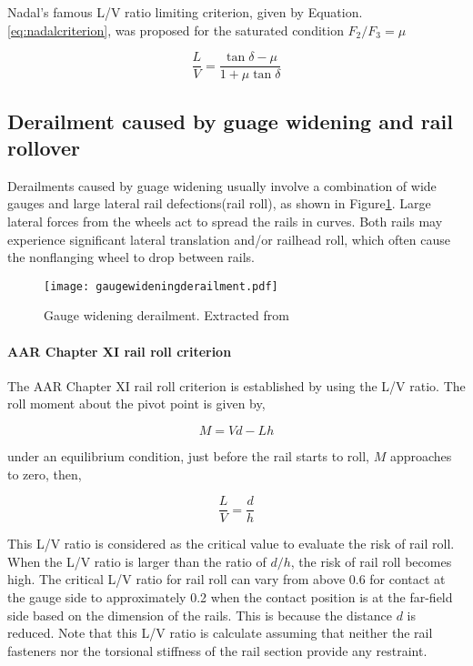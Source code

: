 Nadal's famous L/V ratio limiting criterion, given by Equation.\ref{eq:nadalcriterion}, was proposed for the saturated condition $F_2/F_3=\mu$

\begin{equation}\label{eq:nadalcriterion}
    \frac{L}{V}=\frac{\tan \delta - \mu}{1+ \mu \tan \delta}
\end{equation}

\subsection{Derailment caused by guage widening and rail rollover}
Derailments caused by guage widening usually involve a combination of wide gauges and large lateral rail defections(rail roll), as shown in Figure\ref{fig:gaugewideningderailment}. Large lateral forces from the wheels act to spread the rails in curves. Both rails may experience significant lateral translation and/or railhead roll, which often cause the nonflanging wheel to drop between rails.

\begin{figure}[h]
    \centering
    \texttt{[image: gaugewideningderailment.pdf]}
    \caption{Gauge widening derailment. Extracted from \citet[Figure8.18]{iwnicki2006handbook}}
    \label{fig:gaugewideningderailment}
\end{figure}

\paragraph{AAR Chapter XI rail roll criterion}
The AAR Chapter XI rail roll criterion is established by using the L/V ratio. The roll moment about the pivot point is given by,

\begin{equation}
    M=Vd-Lh
\end{equation}

under an equilibrium condition, just before the rail starts to roll, $M$ approaches to zero, then,

\begin{equation}
    \frac{L}{V}=\frac{d}{h}
\end{equation}

This L/V ratio is considered as the critical value to evaluate the risk of rail roll. When the L/V ratio is larger than the ratio of $d/h$, the risk of rail roll becomes high. The critical L/V ratio for rail roll can vary from above 0.6 for contact at the gauge side to approximately 0.2 when the contact position is at the far-field side based on the dimension of the rails. This is because the distance $d$ is reduced. Note that this L/V ratio is calculate assuming that neither the rail fasteners nor the torsional stiffness of the rail section provide any restraint.

